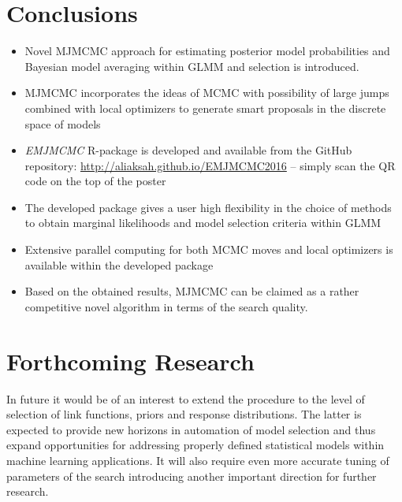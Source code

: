 \documentclass[a0,portrait]{a0poster}
\begin{document}
\begin{multicols}{2}
\color{SaddleBrown} %

\section*{Conclusions}
\begin{itemize}
\item Novel MJMCMC approach for estimating posterior model probabilities and Bayesian model averaging within GLMM and selection is introduced. 
\item   MJMCMC incorporates the ideas of MCMC with possibility of large jumps combined with local optimizers to generate smart proposals in the discrete space of models
\item \textit{EMJMCMC} R-package is developed and available from the GitHub repository: \url{http://aliaksah.github.io/EMJMCMC2016} -- simply scan the QR code on the top of the poster
\item  The developed package gives a user high flexibility in the choice of methods to obtain marginal likelihoods and model selection criteria within GLMM
\item   Extensive parallel computing for both MCMC moves and local optimizers is available within the developed package
\item Based on the obtained results, MJMCMC can be claimed as a rather competitive novel algorithm in terms of the search quality.
\end{itemize}

\color{DarkSlateGray} %


\section*{Forthcoming Research}

In future it would be of an interest to extend the procedure to the level of selection of link functions, priors and response distributions. The latter is expected to provide new horizons in automation of model selection and thus expand opportunities for addressing properly defined statistical models within machine learning applications. It will also require even more accurate tuning of parameters of the search introducing another important direction for further research.
\footnotesize
\color{black}
\let\oldbibliography\thebibliography
\renewcommand{\thebibliography}[1]{\oldbibliography{#1}
\setlength{\itemsep}{2pt}} %


\end{multicols}
\end{document}
